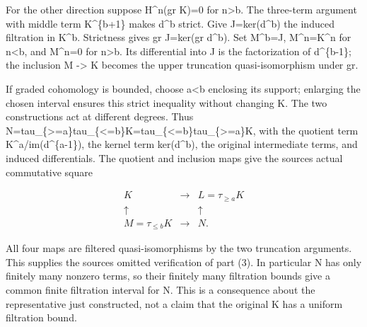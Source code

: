 \documentclass[11pt]{article}
\begin{document}
For the other direction suppose H\^{}n(gr K)\allowbreak{}\allowbreak{}=0 for n\textgreater b. The three-term argument with middle term K\textasciicircum{}\{b\allowbreak{}+1\} makes d\^{}b strict. Give J\allowbreak{}=ker(d\textasciicircum{}b)\allowbreak{} the induced filtration in K\^{}b. Strictness gives gr J\allowbreak{}=ker(gr d\textasciicircum{}b)\allowbreak{}. Set M\textasciicircum{}b\allowbreak{}=J,\allowbreak{} M\textasciicircum{}n\allowbreak{}=K\textasciicircum{}n for n<b,\allowbreak{} and M\textasciicircum{}n\allowbreak{}=0 for n\textgreater b. Its differential into J is the factorization of d\^{}\{b-1\}; the inclusion M \allowbreak{}-> K becomes the upper truncation quasi-isomorphism under gr.

If graded cohomology is bounded,\allowbreak{} choose a\textless b enclosing its support; enlarging the chosen interval ensures this strict inequality without changing K. The two constructions act at different degrees. Thus N\allowbreak{}=tau\_\allowbreak{}\{>\allowbreak{}=a\}tau\_\allowbreak{}\{<\allowbreak{}=b\}K\allowbreak{}=tau\_\allowbreak{}\{<\allowbreak{}=b\}tau\_\allowbreak{}\{>\allowbreak{}=a\}K,\allowbreak{} with the quotient term K\textasciicircum{}a/\allowbreak{}im(d\textasciicircum{}\{a-1\})\allowbreak{},\allowbreak{} the kernel term ker(d\textasciicircum{}b)\allowbreak{},\allowbreak{} the original intermediate terms,\allowbreak{} and induced differentials. The quotient and inclusion maps give the source\textquotesingle s actual commutative square

\[
 \begin{array}{ccc}
 K&\longrightarrow&L=\tau_{\ge a}K\\
 \uparrow&&\uparrow\\
 M=\tau_{\le b}K&\longrightarrow&N.
 \end{array}
\]

All four maps are filtered quasi-isomorphisms by the two truncation arguments. This supplies the source\textquotesingle s omitted verification of part (3)\allowbreak{}. In particular N has only finitely many nonzero terms,\allowbreak{} so their finitely many filtration bounds give a common finite filtration interval for N. This is a consequence about the representative just constructed,\allowbreak{} not a claim that the original K has a uniform filtration bound.
\end{document}
